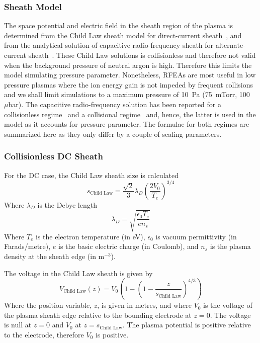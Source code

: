 \subsubsection{\label{SheathModel}Sheath Model}
The space potential and electric field in the sheath region of the plasma is determined from the Child Law sheath model for direct-current sheath~\cite{Lieberman2005}, and from the analytical solution of capacitive radio-frequency sheath for alternate-current sheath~\cite{Lieberman1988,Lieberman1989}. These Child Law solutions is collisionless and therefore not valid when the background pressure of neutral argon is high. Therefore this limits the model simulating pressure parameter. Nonetheless, RFEAs are most useful in low pressure plasmas where the ion energy gain is not impeded by frequent collisions and we shall limit simulations to a maximum pressure of 10~Pa (75~mTorr, 100~$\mu$bar). The capacitive radio-frequency solution has been reported for a collisionless regime~\cite{Lieberman1988} and a collisional regime~\cite{Lieberman1989} and, hence, the latter is used in the model as it accounts for pressure parameter. The formulae for both regimes are summarized here as they only differ by a couple of scaling parameters. 



\subsubsection{Collisionless DC Sheath}

For the DC case, the Child Law sheath size is calculated 
\begin{equation}
s_\text{Child Law} = \frac{\sqrt{2}}{3} \lambda_D \left( \frac{2 V_0}{T_e} \right)^{3/4}
\end{equation}
Where $\lambda_D$ is the Debye length
\begin{equation}
\lambda_D = \sqrt{ \frac{\epsilon_0 T_e}{e n_s} }
\end{equation}
Where $T_e$ is the electron temperature (in eV), $\epsilon_0$ is vacuum permittivity (in Farads/metre), $e$ is the basic electric charge (in Coulomb), and $n_s$ is the plasma density at the sheath edge (in m$^{-3}$).

The voltage in the Child Law sheath is given by
\begin{equation}
V_\text{Child Law}(z) = V_0 \left( 1 -  \left( 1 -\frac{z}{s_\text{Child Law}} \right)^{4/3} \right)
\end{equation}
Where the position variable, $z$, is given in metres, and where $V_0$ is the voltage of the plasma sheath edge relative to the bounding electrode at $z=0$. The voltage is null at $z=0$ and $V_0$ at $z=s_\text{Child Law}$. The plasma potential is positive relative to the electrode, therefore $V_0$ is positive.

